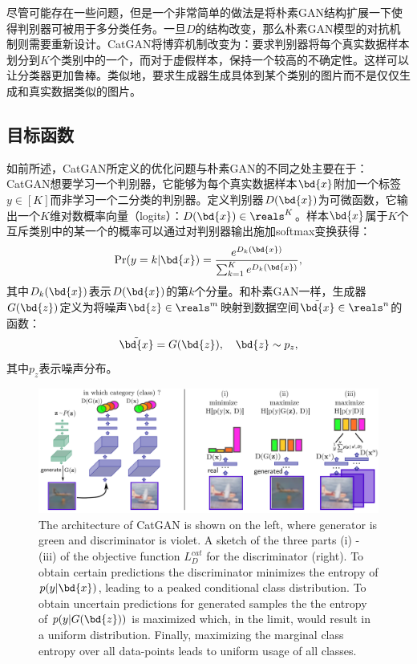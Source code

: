 尽管可能存在一些问题，但是一个非常简单的做法是将朴素GAN结构扩展一下使得判别器可被用于多分类任务。一旦$D$的结构改变，那么朴素GAN模型的对抗机制则需要重新设计。CatGAN将博弈机制改变为：要求判别器将每个真实数据样本划分到$K$个类别中的一个，而对于虚假样本，保持一个较高的不确定性。这样可以让分类器更加鲁棒。类似地，要求生成器生成具体到某个类别的图片而不是仅仅生成和真实数据类似的图片。

\subsection{目标函数}
如前所述，CatGAN所定义的优化问题与朴素GAN的不同之处主要在于：CatGAN想要学习一个判别器，它能够为每个真实数据样本$\bd{x}$附加一个标签$y \in [K]$而非学习一个二分类的判别器。定义判别器$D(\bd{x})$为可微函数，它输出一个$K$维对数概率向量（logits）：$D(\bd{x}) \in \reals^K$。样本$\bd{x}$属于$K$个互斥类别中的某一个的概率可以通过对判别器输出施加softmax变换获得：
\begin{equation}
  \Pr(y=k|\bd{x}) = \frac{e^{D_k(\bd{x})}}{\sum_{k=1}^K e^{D_k(\bd{x})}},
\end{equation}
其中$D_k(\bd{x})$表示$D(\bd{x})$的第$k$个分量。和朴素GAN一样，生成器$G(\bd{z})$定义为将噪声$\bd{z} \in \reals^m$映射到数据空间$\tilde{\bd{x}} \in \reals^n$的函数：
\begin{equation}
  \tilde{\bd{x}} = G(\bd{z}), \quad \bd{z} \sim p_z,
\end{equation}
其中$p_z$表示噪声分布。

\begin{figure}[hbtp]
  \centering
  \includegraphics[width=1.0\textwidth]{Img/arch-catgan.png}
  {The architecture of CatGAN is shown on the left, where generator is green and discriminator is violet. A sketch of the three parts (i) - (iii) of the objective function $L_D^{cat}$ for the discriminator (right). To obtain certain predictions the discriminator minimizes the entropy of $p(y|\bd{x})$, leading to a peaked conditional class distribution. To obtain uncertain predictions for generated samples the the entropy of $p(y|G(\bd{z}))$ is maximized which, in the limit, would result in a uniform distribution. Finally, maximizing the marginal class entropy over all data-points leads to uniform usage of all classes.}
  \label{fig:arch-catgan}
\end{figure}

